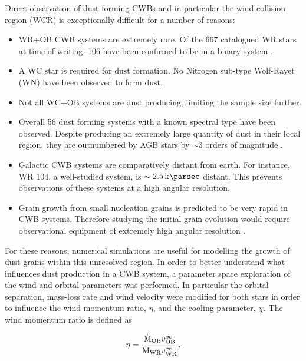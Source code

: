 \documentclass[fleqn,usenatbib]{mnras}
\begin{document}

Direct observation of dust forming CWBs and in particular the wind collision region (WCR) is exceptionally difficult for a number of reasons:

\begin{itemize}
  \item WR+OB CWB systems are extremely rare. Of the 667 catalogued WR stars at time of writing, 106 have been confirmed to be in a binary system \citep{rossloweSpatialDistributionGalactic2015}.
  \item A WC star is required for dust formation. No Nitrogen sub-type Wolf-Rayet (WN) have been observed to form dust.
  \item Not all WC+OB systems are dust producing, limiting the sample size further.
  \item Overall 56 dust forming systems with a known spectral type have been observed. Despite producing an extremely large quantity of dust in their local region, they are outnumbered by AGB stars by $\sim 3$ orders of magnitude \citep{ishiharaGalacticDistributionsCarbon2011}.
  \item Galactic CWB systems are comparatively distant from earth. For instance, WR 104, a well-studied system, is $\sim \SI{2.5}{\kilo\parsec}$ distant. This prevents observations of these systems at a high angular resolution.
  \item Grain growth from small nucleation grains is predicted to be very rapid in CWB systems. Therefore studying the initial grain evolution would require observational equipment of extremely high angular resolution \citep{zubkoPhysicalModelDust1998a}.
\end{itemize}

For these reasons, numerical simulations are useful for modelling the growth of dust grains within this unresolved region.
In order to better understand what influences dust production in a CWB system, a parameter space exploration of the wind and orbital parameters was performed.
In particular the orbital separation, mass-loss rate and wind velocity were modified for both stars in order to influence the wind momentum ratio, $\eta$, and the cooling parameter, $\chi$.
The wind momentum ratio is defined as

\begin{equation}
  \eta = \frac{\dot{\text M}_\text{OB} v^\infty_\text{OB}}{\dot{\text M}_\text{WR}v^\infty_\text{WR}} ,
\end{equation}
\end{document}
